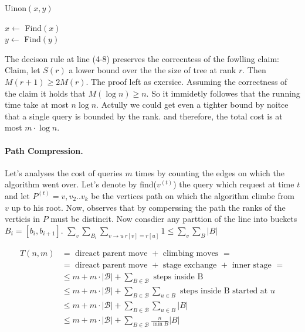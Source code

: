   \begin{algbox}{Uinon$(x,y)$}
  \begin{algorithm}[H]
    $x\leftarrow $ Find$\left( x \right)$ \\
    $y\leftarrow $ Find$\left( y \right)$ \\
  \end{algorithm}
\end{algbox}
The decison rule at line (4-8) preserves the correcntess of the fowlling claim:
Claim, let $S(r)$ a lower bound over the the size of tree at rank $r$. Then $M\left( r+1 \right) \ge 2M\left( r \right)$. The proof left as excrsice. Assuming the correctness of the claim it holds that $M\left( \log n \right) \ge n $. So it immidetly followes that the running time take at most $n\log n$. Actully we could get even a tighter bound by noitce that a single query is bounded by the rank. and therefore, the total cost is at most $m \cdot \log n$. 

\paragraph{Path Compression.} Let's analyses the cost of queries $m$ times by counting the edges on which the algorithm went over. Let's denote by find($v^{(t)}$) the query which request at time $t$ and let $P^{(t)}=v,v_{2} .. v_{k}$ be the vertices path on which the algorithm climbe from $v$ up to his root. Now, observes that by comperssing the path the ranks of the verticis in $P$ must be distincit. Now consdier any parttion of the line into buckets $B_{i} = [b_{i} ,b_{i+1}]$. $\sum_{v}{\sum_{B_{i}}{\sum_{v \rightarrow u \ r[v]=r[u] }{1}}} \le \sum_{v}{\sum_{B}{|B|}}$   

\begin{equation*}
  \begin{split}
    T\left( n, m  \right) &= \text{ direact parent move } + \text{ climbing moves  } =    \\
    &=  \text{ direact parent move } + \text{ stage exchange } +  \text{ inner stage } = \\ 
    & \le m + m \cdot | \mathcal{B} | + \sum_{ B \in \mathcal{B} }{ \text{ steps inside B  }   }\\
    & \le m + m \cdot | \mathcal{B} | + \sum_{ B \in \mathcal{B} }{ \sum_{u \in B} { \text{ steps inside B started at }u }  }\\
    & \le m + m \cdot | \mathcal{B} | + \sum_{ B \in \mathcal{B} }{ \sum_{u \in B}{ |B| }  } \\ 
    & \le m + m \cdot | \mathcal{B} | + \sum_{ B \in \mathcal{B} }{ \frac{n}{\min{B} } |B| }
  \end{split}
\end{equation*}



